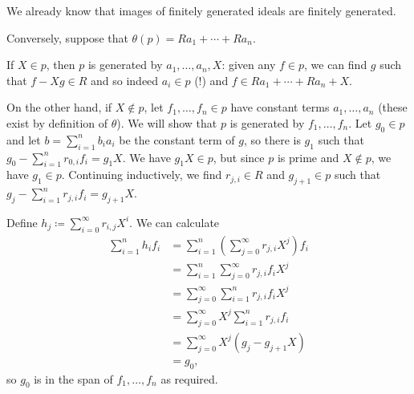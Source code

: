 We already know that images of finitely generated ideals are finitely generated.

Conversely, suppose that $\theta(p) = Ra_1 + \cdots + Ra_n$.

If $X \in p$, then $p$ is generated by $a_1, \ldots, a_n, X$: given any $f \in p$,
we can find $g$ such that $f-Xg \in R$ and so indeed $a_i \in p$ (!) and
$f \in Ra_1 + \cdots + Ra_n + X$.

On the other hand, if $X\notin p$, let $f_1, \ldots, f_n \in p$ have constant
terms $a_1, \ldots, a_n$ (these exist by definition of $\theta$).
We will show that $p$ is generated by $f_1, \ldots, f_n$. Let $g_0 \in p$ and
let $b = \sum_{i=1}^nb_ia_i$ be the constant term of $g$, so there is
$g_1$ such that $g_0 - \sum_{i = 1}^nr_{0, i}f_i = g_1X$. We have $g_1X \in p$, but
since $p$ is prime and $X \notin p$, we have $g_1 \in p$. Continuing inductively,
we find $r_{j, i} \in R$ and $g_{j + 1} \in p$ such that
$g_{j} - \sum_{i = 1}^nr_{j, i}f_i = g_{j + 1}X$.

Define $h_j \coloneqq \sum_{i = 0}^\infty r_{i, j}X^i$. We can calculate
\begin{align*}
	\sum_{i=1}^n h_if_i
	&= \sum_{i = 1}^n\left(\sum_{j = 0}^{\infty}r_{j, i}X^j\right)f_i\\
	&= \sum_{i=1}^n\sum_{j=0}^\infty r_{j, i}f_iX^j\\
	&= \sum_{j=0}^\infty \sum_{i=1}^nr_{j, i}f_iX^j\\
	&= \sum_{j=0}^\infty X^j\sum_{i=1}^n r_{j, i}f_i\\
	&= \sum_{j=0}^\infty X^j(g_j - g_{j+1}X)\\
	&= g_0,
\end{align*}
so $g_0$ is in the span of $f_1, \ldots, f_n$ as required.
